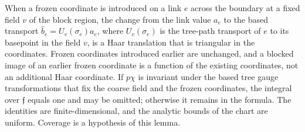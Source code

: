 \begin{lemma}
When a frozen coordinate is introduced on a link $e$ across the boundary at a fixed field $v$ of the block region, the change from the link value $a_e$ to the based transport $\widehat b_e=U_v(\sigma_e)a_e$, where $U_v(\sigma_e)$ is the tree-path transport of $e$ to its basepoint in the field $v$, is a Haar translation that is triangular in the coordinates. Frozen coordinates introduced earlier are unchanged, and a blocked image of an earlier frozen coordinate is a function of the existing coordinates, not an additional Haar coordinate. If $p\chi$ is invariant under the based tree gauge transformations that fix the coarse field and the frozen coordinates, the integral over $\mathfrak f$ equals one and may be omitted; otherwise it remains in the formula. The identities are finite-dimensional, and the analytic bounds of the chart are uniform. Coverage is a hypothesis of this lemma.
\end{lemma}

